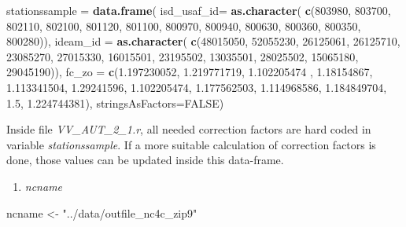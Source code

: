 \documentclass[12pt,oneside]{reedthesis}
\newenvironment{Shaded}{\begin{snugshade}}{\end{snugshade}}
\newcommand{\DataTypeTok}[1]{\textcolor[rgb]{0.13,0.29,0.53}{#1}}
\newcommand{\DecValTok}[1]{\textcolor[rgb]{0.00,0.00,0.81}{#1}}
\newcommand{\FloatTok}[1]{\textcolor[rgb]{0.00,0.00,0.81}{#1}}
\newcommand{\KeywordTok}[1]{\textcolor[rgb]{0.13,0.29,0.53}{\textbf{#1}}}
\newcommand{\NormalTok}[1]{#1}
\newcommand{\OtherTok}[1]{\textcolor[rgb]{0.56,0.35,0.01}{#1}}
\newcommand{\StringTok}[1]{\textcolor[rgb]{0.31,0.60,0.02}{#1}}
\providecommand{\tightlist}{%
  \setlength{\itemsep}{0pt}\setlength{\parskip}{0pt}}
\begin{document}
\vspace{0.4cm}
\begin{Shaded}
\begin{Highlighting}[]
\NormalTok{    stationssample =}\StringTok{ }\KeywordTok{data.frame}\NormalTok{(}
      \DataTypeTok{isd_usaf_id=} \KeywordTok{as.character}\NormalTok{(}
        \KeywordTok{c}\NormalTok{(}\DecValTok{803980}\NormalTok{, }\DecValTok{803700}\NormalTok{, }\DecValTok{802110}\NormalTok{, }\DecValTok{802100}\NormalTok{, }\DecValTok{801120}\NormalTok{, }\DecValTok{801100}\NormalTok{, }
          \DecValTok{800970}\NormalTok{, }\DecValTok{800940}\NormalTok{, }\DecValTok{800630}\NormalTok{, }\DecValTok{800360}\NormalTok{, }\DecValTok{800350}\NormalTok{, }\DecValTok{800280}\NormalTok{)), }
      \DataTypeTok{ideam_id =} \KeywordTok{as.character}\NormalTok{(}
        \KeywordTok{c}\NormalTok{(}\DecValTok{48015050}\NormalTok{, }\DecValTok{52055230}\NormalTok{, }\DecValTok{26125061}\NormalTok{, }\DecValTok{26125710}\NormalTok{, }\DecValTok{23085270}\NormalTok{, }\DecValTok{27015330}\NormalTok{, }
          \DecValTok{16015501}\NormalTok{, }\DecValTok{23195502}\NormalTok{, }\DecValTok{13035501}\NormalTok{, }\DecValTok{28025502}\NormalTok{, }\DecValTok{15065180}\NormalTok{, }\DecValTok{29045190}\NormalTok{)),}
      \DataTypeTok{fc_zo =} 
        \KeywordTok{c}\NormalTok{(}\FloatTok{1.197230052}\NormalTok{, }\FloatTok{1.219771719}\NormalTok{, }\FloatTok{1.102205474}\NormalTok{ , }\FloatTok{1.18154867}\NormalTok{, }\FloatTok{1.113341504}\NormalTok{, }\FloatTok{1.29241596}\NormalTok{, }
          \FloatTok{1.102205474}\NormalTok{, }\FloatTok{1.177562503}\NormalTok{, }\FloatTok{1.114968586}\NormalTok{, }\FloatTok{1.184849704}\NormalTok{, }\FloatTok{1.5}\NormalTok{, }\FloatTok{1.224744381}\NormalTok{),  }
      \DataTypeTok{stringsAsFactors=}\OtherTok{FALSE}\NormalTok{)}
\end{Highlighting}
\end{Shaded}
\normalsize

Inside file \emph{VV\_AUT\_2\_1.r}, all needed correction factors are hard coded in variable \emph{stationssample}. If a more suitable calculation of correction factors is done, those values can be updated inside this data-frame.
\begin{enumerate}
\def\labelenumi{\arabic{enumi}.}
\setcounter{enumi}{2}
\tightlist
\item
  \emph{ncname}
\end{enumerate}
\scriptsize

\vspace{0.4cm}
\begin{Shaded}
\begin{Highlighting}[]
\NormalTok{      ncname <-}\StringTok{ "../data/outfile_nc4c_zip9"}
\end{Highlighting}
\end{Shaded}
\normalsize
\end{document}
